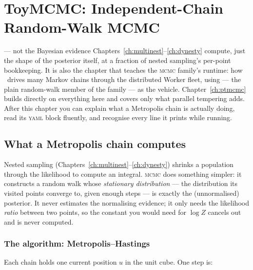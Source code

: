\chapter{ToyMCMC: Independent-Chain Random-Walk MCMC}
\label{ch:toymcmc}

 ---
not the Bayesian evidence Chapters~\ref{ch:multinest}--\ref{ch:dynesty} compute, just
the shape of the posterior itself, at a fraction of nested sampling's per-point
bookkeeping. It is also the chapter that teaches the \textsc{mcmc} family's runtime:
how \Jtwo\ drives many Markov chains through the distributed Worker fleet, using
 --- the plain random-walk member of the family --- as the vehicle.
Chapter~\ref{ch:ptmcmc} builds directly on everything here and covers only what
parallel tempering adds. After this chapter you can explain what a Metropolis chain is
actually doing, read its \textsc{yaml} block fluently, and recognise every line it
prints while running.

\section{What a Metropolis chain computes}
\label{sec:mcmc-what}

Nested sampling (Chapters~\ref{ch:multinest}--\ref{ch:dynesty}) shrinks a population
through the likelihood to compute an integral. \textsc{mcmc} does something simpler:
it constructs a random walk whose \emph{stationary distribution} --- the distribution
its visited points converge to, given enough steps --- is exactly the (unnormalised)
posterior. It never estimates the normalising evidence; it only needs the
likelihood \emph{ratio} between two points, so the constant you would need for
$\log Z$ cancels out and is never computed.

\subsection{The algorithm: Metropolis--Hastings}
\label{sec:mcmc-algorithm}

Each chain holds one current position $u$ in the unit cube. One step is:

